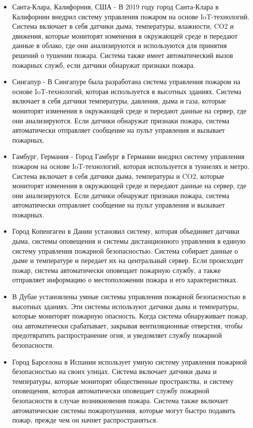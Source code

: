 \begin{multicols}{2}
\begin{itemize}
\item
  Санта-Клара, Калифорния, США - В 2019 году город Санта-Клара в
  Калифорнии внедрил систему управления пожаром на основе
  IoT-технологий. Система включает в себя датчики дыма, температуры,
  влажности, CO2 и движения, которые мониторят изменения в окружающей
  среде и передают данные в облако, где они анализируются и используются
  для принятия решений о тушении пожара. Система также имеет
  автоматический вызов пожарных служб, если датчики обнаружат признаки
  пожара.
\item
  Сингапур - В Сингапуре была разработана система управления пожаром на
  основе IoT-технологий, которая используется в высотных зданиях.
  Система включает в себя датчики температуры, давления, дыма и газа,
  которые мониторят изменения в окружающей среде и передают данные на
  сервер, где они анализируются. Если датчики обнаружат признаки пожара,
  система автоматически отправляет сообщение на пульт управления и
  вызывает пожарных.
\item
  Гамбург, Германия - Город Гамбург в Германии внедрил систему
  управления пожаром на основе IoT-технологий, которая используется в
  туннелях и метро. Система включает в себя датчики дыма, температуры и
  CO2, которые мониторят изменения в окружающей среде и передают данные
  на сервер, где они анализируются. Если датчики обнаружат признаки
  пожара, система автоматически отправляет сообщение на пульт управления
  и вызывает пожарных.
\item
  Город Копенгаген в Дании установил систему, которая объединяет датчики
  дыма, системы оповещения и системы дистанционного управления в единую
  систему управления пожарной безопасностью. Система собирает данные о
  дыме и температуре и передает их на центральный сервер. Если
  происходит пожар, система автоматически оповещает пожарную службу, а
  также отправляет информацию о местоположении пожара и его
  характеристиках.
\item
  В Дубае установлены умные системы управления пожарной безопасностью в
  высотных зданиях. Эти системы используют датчики дыма и температуры,
  которые мониторят пожарную опасность. Когда система обнаруживает
  пожар, она автоматически срабатывает, закрывая вентиляционные
  отверстия, чтобы предотвратить распространение огня, и уведомляет
  службу пожарной безопасности.
\item
  Город Барселона в Испании использует умную систему управления пожарной
  безопасностью на своих улицах. Система включает датчики дыма и
  температуры, которые мониторят общественные пространства, и систему
  оповещения, которая автоматически оповещает службу пожарной
  безопасности в случае возникновения пожара. Система также включает
  автоматические системы пожаротушения, которые могут быстро подавить
  пожар, прежде чем он начнет распространяться.
\end{itemize}


\end{multicols}
